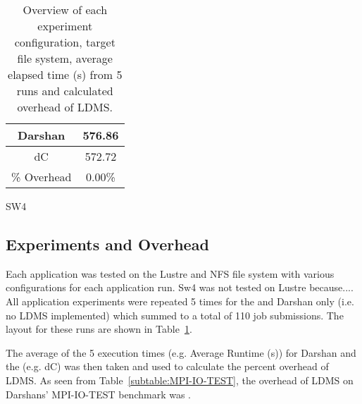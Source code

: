 \begin{table}[h]
\begin{subtable}[h]{0.2\textwidth}
\begin{tabular}{|ccl|}
        \multicolumn{1}{|c|}{Darshan}          & \multicolumn{2}{c|}{576.86}       \\ \hline
        \multicolumn{1}{|c|}{dC} & \multicolumn{2}{c|}{572.72}       \\ \hline
        \multicolumn{1}{|c|}{\% Overhead}      & \multicolumn{2}{c|}{0.00\%}      \\ \hline
        \end{tabular}
    \caption{SW4} 
    \label{subtable:SW4}
\end{subtable}
\caption{Overview of each experiment configuration, target file system, average elapsed time (s) from 5 runs and calculated overhead of LDMS.}
\label{table:apps}
\end{table}

\subsection{Experiments and Overhead}
Each application was tested on the Lustre and NFS file system with various configurations for each application run. Sw4 was not tested on Lustre because.... All application experiments were repeated 5 times for the \connector{} and Darshan only (i.e. no LDMS implemented) which summed to a total of 110 job submissions. The layout for these runs are shown in Table~\ref{table:apps}.  



The average of the 5 execution times (e.g. Average Runtime (s)) for Darshan and the \connector{} (e.g. dC) was then taken and used to calculate the percent overhead of LDMS. As seen from Table~\ref{subtable:MPI-IO-TEST}, the overhead of LDMS on Darshans' MPI-IO-TEST benchmark was .


